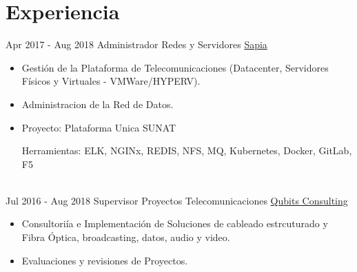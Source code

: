 \documentclass[letterpaper]{twentysecondcv} %
\begin{document}
\makeprofile %
 

\section{Experiencia}

\begin{twenty} %
\twentyitem
    	{Apr 2017 -}
		{Aug 2018}
        {Administrador Redes y Servidores}
        {\href{http://www.sapia.com.pe/}{Sapia}}
        {}
        {\begin{itemize}
        \item Gestión de la Plataforma de Telecomunicaciones (Datacenter, Servidores Físicos y Virtuales - VMWare/HYPERV).
        \item Administracion de la Red de Datos.
        \item Proyecto: Plataforma Unica SUNAT 
        
        Herramientas: ELK, NGINx, REDIS, NFS, MQ, Kubernetes, Docker, GitLab, F5
        
           \end{itemize}}
        \\
	\twentyitem
    	{Jul 2016 -}
		{Aug 2018}
        {Supervisor Proyectos Telecomunicaciones}
        {\href{http://www.qubitsconsulting.com/}{Qubits Consulting}}
        {}
        {
        {\begin{itemize}
        \item Consultoriía e Implementación de Soluciones de cableado estrcuturado y Fibra Óptica, broadcasting, datos, audio y video.
        \item Evaluaciones y revisiones de Proyectos.
  

\end{itemize}}}
\end{twenty}
\end{document}
